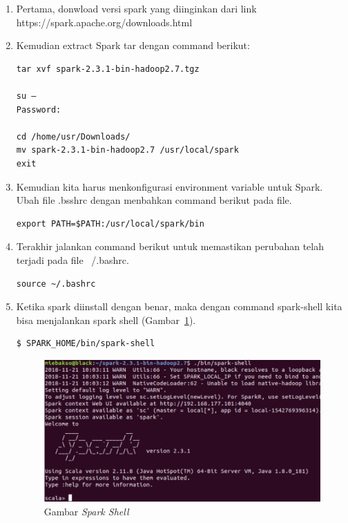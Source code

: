 \documentclass[a4paper,twoside]{article}
\begin{document}
\begin{enumerate}
\begin{enumerate}

\item Pertama, donwload versi spark yang diinginkan  dari link https://spark.apache.org/downloads.html

\item Kemudian extract Spark tar dengan command berikut:

\begin{verbatim}
tar xvf spark-2.3.1-bin-hadoop2.7.tgz 

su – 
Password:

cd /home/usr/Downloads/ 
mv spark-2.3.1-bin-hadoop2.7 /usr/local/spark 
exit 

\end{verbatim}

\item Kemudian kita harus menkonfigurasi environment variable untuk Spark. Ubah file .bsshrc dengan menbahkan command berikut pada file.

\begin{verbatim}
export PATH=$PATH:/usr/local/spark/bin
\end{verbatim}

\item Terakhir jalankan command berikut untuk memastikan perubahan telah terjadi pada file ~/.bashrc.

\begin{verbatim}
source ~/.bashrc
\end{verbatim}

\item Ketika spark diinstall dengan benar, maka dengan command spark-shell kita bisa menjalankan spark shell (Gambar~\ref{fig:sparkshell}).

\begin{verbatim}
$ SPARK_HOME/bin/spark-shell
\end{verbatim}

\begin{figure}[H]
    \centering  
    \includegraphics[scale=0.5]{sparkshell}  
    \caption[Gambar {\it Spark Shell} ]{Gambar {\it Spark Shell}} 
    \label{fig:sparkshell} 
\end{figure}


\end{enumerate}
\end{enumerate}
\end{document}
